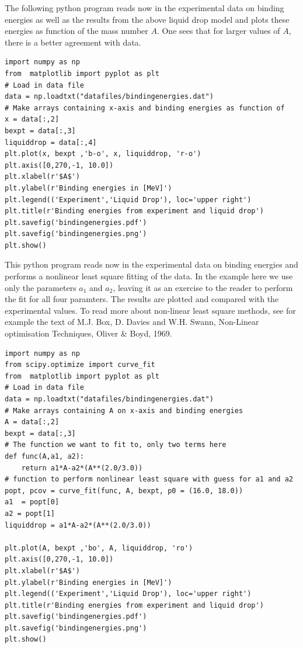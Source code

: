 \documentclass[%
oneside,                 %
final,                   %
10pt]{article}
\begin{document}
The following python program reads now in the experimental data on binding energies as well as the results from the above liquid drop model and plots these energies as function of the mass number $A$. One sees that for larger values of $A$, there is a better agreement with data. 
\begin{verbatim}
import numpy as np
from  matplotlib import pyplot as plt
# Load in data file
data = np.loadtxt("datafiles/bindingenergies.dat")
# Make arrays containing x-axis and binding energies as function of
x = data[:,2]
bexpt = data[:,3]
liquiddrop = data[:,4]
plt.plot(x, bexpt ,'b-o', x, liquiddrop, 'r-o')
plt.axis([0,270,-1, 10.0])
plt.xlabel(r'$A$')
plt.ylabel(r'Binding energies in [MeV]')
plt.legend(('Experiment','Liquid Drop'), loc='upper right')
plt.title(r'Binding energies from experiment and liquid drop')
plt.savefig('bindingenergies.pdf')
plt.savefig('bindingenergies.png')
plt.show()
\end{verbatim}


This  python program reads now in the experimental data on binding energies and performs a nonlinear least square fitting of the data. In the example here we use only the parameters $a_1$ and $a_2$, leaving it as an exercise to the reader to perform the fit for all four paramters. The results are plotted and compared with the experimental values.  To read more about non-linear least square methods, see for example the text of M.J. Box, D. Davies and W.H. Swann, Non-Linear optimisation Techniques, Oliver {\&} Boyd, 1969.
\begin{verbatim}
import numpy as np
from scipy.optimize import curve_fit
from  matplotlib import pyplot as plt
# Load in data file
data = np.loadtxt("datafiles/bindingenergies.dat")
# Make arrays containing A on x-axis and binding energies
A = data[:,2]
bexpt = data[:,3]
# The function we want to fit to, only two terms here
def func(A,a1, a2):
    return a1*A-a2*(A**(2.0/3.0))
# function to perform nonlinear least square with guess for a1 and a2
popt, pcov = curve_fit(func, A, bexpt, p0 = (16.0, 18.0))
a1  = popt[0]
a2 = popt[1]
liquiddrop = a1*A-a2*(A**(2.0/3.0))

plt.plot(A, bexpt ,'bo', A, liquiddrop, 'ro')
plt.axis([0,270,-1, 10.0])
plt.xlabel(r'$A$')
plt.ylabel(r'Binding energies in [MeV]')
plt.legend(('Experiment','Liquid Drop'), loc='upper right')
plt.title(r'Binding energies from experiment and liquid drop')
plt.savefig('bindingenergies.pdf')
plt.savefig('bindingenergies.png')
plt.show()
\end{verbatim}
\end{document}
